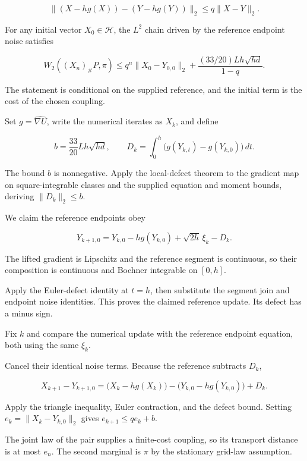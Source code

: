 \documentclass[11pt,a4paper]{article}
\begin{document}
\[\|(X-hg(X))-(Y-hg(Y))\|_2\le q\|X-Y\|_2.\]

For any initial vector \(X_0\in\mathcal H\), the \(L^2\) chain driven by the reference endpoint noise satisfies

\[W_2((X_n)_\#P,\pi)\le q^n\|X_0-Y_{0,0}\|_2+\frac{(33/20)Lh\sqrt{hd}}{1-q}.\]

The statement is conditional on the supplied reference, and the initial term is the cost of the chosen coupling.



Set \(g=\widehat{\nabla U}\), write the numerical iterates as \(X_k\), and define

\[b=\frac{33}{20}Lh\sqrt{hd},\qquad D_k=\int_0^h\bigl(g(Y_{k,t})-g(Y_{k,0})\bigr)\,dt.\]

The bound \(b\) is nonnegative. Apply the local-defect theorem to the gradient map on square-integrable classes and the supplied equation and moment bounds, deriving \(\|D_k\|_2\le b\).



We claim the reference endpoints obey

\[Y_{k+1,0}=Y_{k,0}-hg(Y_{k,0})+\sqrt{2h}\,\xi_k-D_k.\]

The lifted gradient is Lipschitz and the reference segment is continuous, so their composition is continuous and Bochner integrable on \([0,h]\).



Apply the Euler-defect identity at \(t=h\), then substitute the segment join and endpoint noise identities. This proves the claimed reference update. Its defect has a minus sign.



Fix \(k\) and compare the numerical update with the reference endpoint equation, both using the same \(\xi_k\).



Cancel their identical noise terms. Because the reference subtracts \(D_k\),

\[X_{k+1}-Y_{k+1,0}=\bigl(X_k-hg(X_k)\bigr)-\bigl(Y_{k,0}-hg(Y_{k,0})\bigr)+D_k.\]

Apply the triangle inequality, Euler contraction, and the defect bound. Setting \(e_k=\|X_k-Y_{k,0}\|_2\) gives \(e_{k+1}\le qe_k+b\).



The joint law of the pair supplies a finite-cost coupling, so its transport distance is at most \(e_n\). The second marginal is \(\pi\) by the stationary grid-law assumption.
\end{document}
